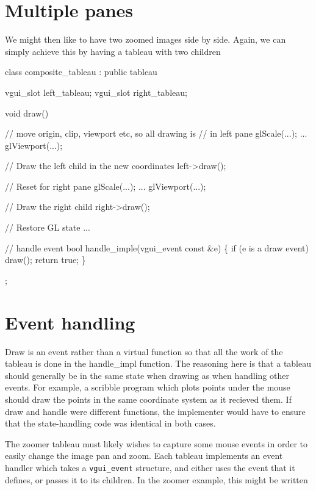 \documentclass[12pt]{report} \usepackage{epsfig}
\begin{document}
\section{Multiple panes}
 
We might then like to have two zoomed images side by side.  Again, we can
simply achieve this by having a tableau with two children
 
{\scriptsize \begin{verbawf}
  class composite\_tableau : public tableau {
    vgui_slot left_tableau;
    vgui_slot right_tableau;

    void draw() {
      //  move origin, clip, viewport etc, so all drawing is
      //  in left pane
      glScale(...);
      ...
      glViewport(...);
 
      //  Draw the left child in the new coordinates 
      left->draw();

      //  Reset for right pane
      glScale(...);
      ...
      glViewport(...);
 
      //  Draw the right child
      right->draw();
 
      //  Restore GL state
      ...
    }

    // handle event
    bool handle_imple(vgui_event const &e)
    \{
      if (e is a draw event)
        draw();
      return true;
    \}
  };
\end{verbawf}}
 
\section{Event handling}
 
Draw is an event rather than a virtual function so that
all the work of the tableau is done in the handle\_impl function.
The reasoning here is that a tableau should generally be in the same
state when drawing as when handling other events.  For example, a scribble
program which plots points under the mouse should draw the points in
the same coordinate system as it recieved them.   If draw and handle
were different functions, the implementer would have to ensure that
the state-handling code was identical in both cases.

The zoomer tableau must likely wishes to capture some mouse events in order
to easily change the image pan and zoom.  Each tableau implements an event
handler which takes a {\tt vgui\_event} structure, and either uses
the event that it defines, or passes it to its children.  In the zoomer
example, this might be written
\end{document}
